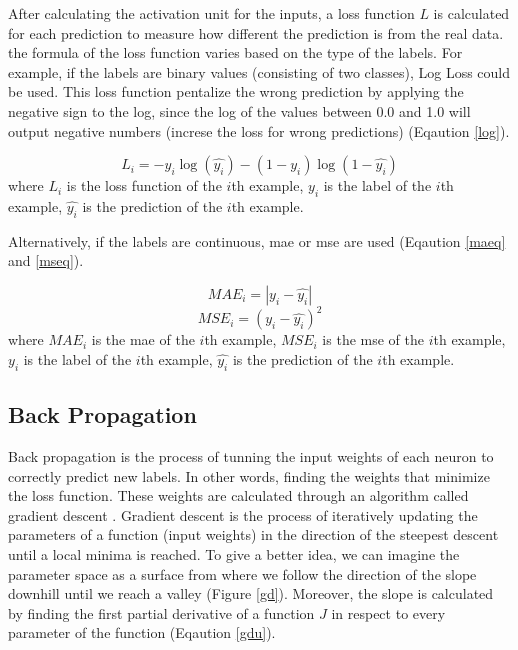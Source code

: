 \documentclass[runningheads]{llncs}
\begin{document}
After calculating the activation unit for the inputs, 
a loss function $L$ is calculated for each prediction to measure 
how different the prediction is from the real data. the formula of the loss function varies based on the type of the labels.
For example, if the labels are binary values (consisting of two classes), 
Log Loss could be used. 
This loss function pentalize the wrong prediction by applying the negative sign 
to the log, since the log of the values between 0.0 and 1.0 will output negative numbers
(increse the loss for wrong predictions) (Eqaution \ref{log}). 

\begin{equation}
    \label{log}
L_{i} = -y_{i} \log{(\hat{y_{i}})} - (1 - y_{i})\log{(1-\hat{y_{i}})}
\end{equation}
where $L_{i}$ is the loss function of the $i$th example, $y_{i}$ is the label of the $i$th example,
$\hat{y_{i}}$ is the prediction of the $i$th example.


Alternatively, if the labels are continuous, 
\gls{mae} or \gls{mse} are used (Eqaution \ref{maeq} and \ref{mseq}).

\begin{equation}
    \label{maeq}
    MAE_{i} = |y_{i} - \hat{y_{i}}|
\end{equation}
\begin{equation}
    \label{mseq}
    MSE_{i} = {(y_{i} - \hat{y_{i}})}^2
\end{equation}
where $MAE_{i}$ is the \gls{mae} of the $i$th example, $MSE_{i}$ is the \gls{mse} of the $i$th example,  
$y_{i}$ is the label of the $i$th example,
$\hat{y_{i}}$ is the prediction of the $i$th example.


\subsection{Back Propagation}

Back propagation is the process of tunning the input weights of each 
neuron to correctly predict new labels. In other words,
finding the weights that minimize the loss function. These weights are calculated through
an algorithm called gradient descent \cite{lemarechal2012cauchy}. Gradient descent is the process of iteratively updating
the parameters of a function (input weights) in the direction of the steepest descent until a local minima is reached.
To give a better idea, we can imagine the parameter space as a surface from where we follow
the direction of the slope downhill until we reach a valley (Figure \ref{gd}).
Moreover, the slope is calculated by finding the first partial derivative of a function $J$ in respect to every parameter of the function (Eqaution \ref{gdu}). 
\end{document}
